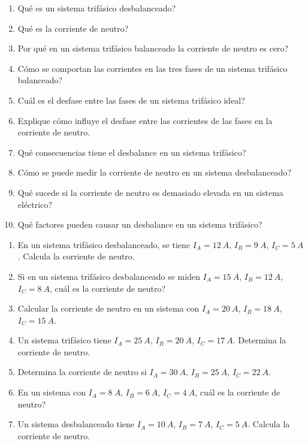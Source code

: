 \documentclass[../main]{subfiles}
\begin{document}
\begin{enumerate}
\item \textquestiondown{}Qu\'e{} es un sistema trif\'asico{} desbalanceado?
\item \textquestiondown{}Qu\'e{} es la corriente de neutro?
\item \textquestiondown{}Por qu\'e{} en un sistema trif\'asico{} balanceado la corriente de neutro es cero?
\item \textquestiondown{}C\'omo{} se comportan las corrientes en las tres fases de un sistema trif\'asico{} balanceado?
\item \textquestiondown{}Cu\'al{} es el desfase entre las fases de un sistema trif\'asico{} ideal?
\item Explique c\'omo{} influye el desfase entre las corrientes de las fases en la corriente de neutro.
\item \textquestiondown{}Qu\'e{} consecuencias tiene el desbalance en un sistema trif\'asico{}?
\item \textquestiondown{}C\'omo{} se puede medir la corriente de neutro en un sistema desbalanceado?
\item \textquestiondown{}Qu\'e{} sucede si la corriente de neutro es demasiado elevada en un sistema el\'ectrico{}?
\item \textquestiondown{}Qu\'e{} factores pueden causar un desbalance en un sistema trif\'asico{}?
\end{enumerate}

\begin{enumerate}
\item En un sistema trif\'asico{} desbalanceado, se tiene $I_A = \qty{12}{A}$, $I_B = \qty{9}{A}$, $I_C = \qty{5}{A}$. Calcula la corriente de neutro.
\item Si en un sistema trif\'asico{} desbalanceado se miden $I_A = \qty{15}{A}$, $I_B = \qty{12}{A}$, $I_C = \qty{8}{A}$, \textquestiondown{}cu\'al{} es la corriente de neutro?
\item Calcular la corriente de neutro en un sistema con $I_A = \qty{20}{A}$, $I_B = \qty{18}{A}$, $I_C = \qty{15}{A}$.
\item Un sistema trif\'asico{} tiene $I_A = \qty{25}{A}$, $I_B = \qty{20}{A}$, $I_C = \qty{17}{A}$. Determina la corriente de neutro.
\item Determina la corriente de neutro si $I_A = \qty{30}{A}$, $I_B = \qty{25}{A}$, $I_C = \qty{22}{A}$.
\item En un sistema con $I_A = \qty{8}{A}$, $I_B = \qty{6}{A}$, $I_C = \qty{4}{A}$, \textquestiondown{}cu\'al{} es la corriente de neutro?
\item Un sistema desbalanceado tiene $I_A = \qty{10}{A}$, $I_B = \qty{7}{A}$, $I_C = \qty{5}{A}$. Calcula la corriente de neutro.
\end{enumerate}
\end{document}
